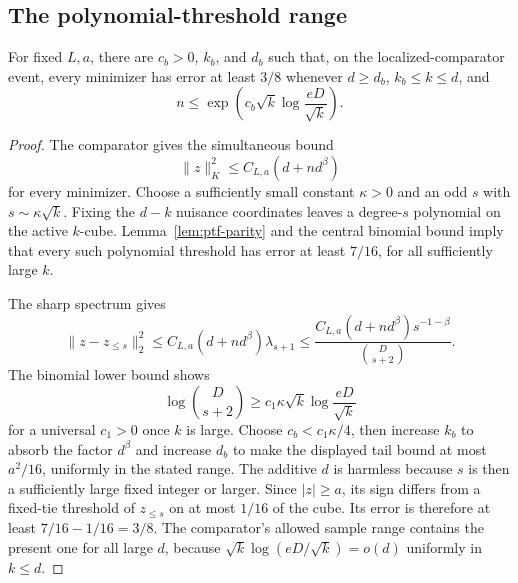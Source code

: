 \subsection{The polynomial-threshold range}
\begin{lemma}
\label{lem:positive-sqrt-range}
For fixed $L,a$, there are $c_b>0$, $k_b$, and $d_b$ such that, on the
localized-comparator event, every minimizer has error at least $3/8$
whenever $d\ge d_b$, $k_b\le k\le d$, and
\[
 n\le\exp\left(c_b\sqrt{k}\log\frac{eD}{\sqrt{k}}\right).
\]
\end{lemma}
\begin{proof}
The comparator gives the simultaneous bound
\begin{equation}
 \|z\|_K^2\le C_{L,a}(d+n d^\beta)
 \label{eq:positive-comparator-budget}
\end{equation}
for every minimizer. Choose a sufficiently small constant $\kappa>0$
and an odd $s$ with $s\sim\kappa\sqrt{k}$.
Fixing the $d-k$ nuisance coordinates leaves a degree-$s$ polynomial
on the active $k$-cube. Lemma~\ref{lem:ptf-parity} and the central
binomial bound imply that every such polynomial threshold has error
at least $7/16$, for all sufficiently large $k$.

The sharp spectrum gives
\[
 \|z-z_{\le s}\|_2^2
 \le C_{L,a}(d+n d^\beta)\lambda_{s+1}
 \le\frac{C_{L,a}(d+n d^\beta)s^{-1-\beta}}
            {\binom D{s+2}}.
\]
The binomial lower bound shows
\[
 \log\binom D{s+2}
 \ge c_1\kappa\sqrt{k}\log\frac{eD}{\sqrt{k}}
\]
for a universal $c_1>0$ once $k$ is large.
Choose $c_b<c_1\kappa/4$, then increase $k_b$ to absorb the factor
$d^\beta$ and increase $d_b$ to make the displayed tail bound at most
$a^2/16$, uniformly in the stated range. The additive $d$ is harmless
because $s$ is then a sufficiently large fixed integer or larger.
Since $|z|\ge a$, its sign differs from a fixed-tie threshold of
$z_{\le s}$ on at most $1/16$ of the cube. Its error is therefore
at least $7/16-1/16=3/8$.
The comparator's allowed sample range contains the present one for all
large $d$, because $\sqrt{k}\log(eD/\sqrt{k})=o(d)$ uniformly in $k\le d$.
\end{proof}

